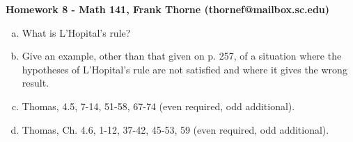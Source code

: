\documentclass[12pt]{article}
\begin{document}
\setlength{\topmargin}{-2mm}





\begin{center}{\bf Homework 8 - Math 141, Frank Thorne (thornef@mailbox.sc.edu)}
\end{center}

\begin{enumerate}[(a)]

\item
What is L'Hopital's rule?

\item
Give an example, other than that given on p. 257, of a situation where the
hypotheses of L'Hopital's rule are not satisfied and where it gives the wrong result.

\item
Thomas, 4.5, 7-14, 51-58, 67-74 (even required, odd additional).

\item
Thomas, Ch. 4.6, 1-12, 37-42, 45-53, 59 (even required, odd additional).

\end{enumerate}
\end{document}
